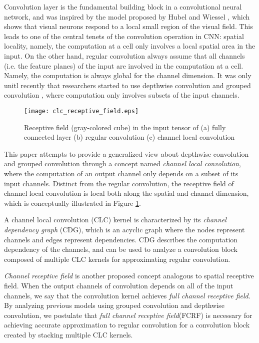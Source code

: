 \documentclass[10pt,twocolumn,letterpaper]{article}
\begin{document}
Convolution layer is the fundamental building block in a convolutional neural network, and was inspired by the model proposed by Hubel and Wiessel \cite{receptivefield1968hubel}, which shows that visual neurons respond to a local small region of the visual field. This leads to one of the central tenets of the convolution operation in CNN: spatial locality, namely, the computation at a cell only involves a local spatial area in the input.  On the other hand, regular convolution always assume that all channels (i.e. the feature planes) of the input are involved in the computation at a cell. Namely, the computation is always global for the channel dimension. It was only unitl recently that researchers started to use depthwise convolution \cite{xception2017chollet} and grouped convolution \cite{alexnet2012krizhevsky} , where computation only involves subsets of the input channels. 

\begin{figure}[t!]
\begin{center}
\texttt{[image: clc\_receptive\_field.eps]}
\end{center}
   \caption{Receptive field (gray-colored cube) in the input tensor of (a) fully connected layer (b) regular convolution (c) channel local convolution }
\label{fig:recept_fd}
\end{figure}

This paper attempts to provide a generalized view about depthwise convolution and grouped convolution through a concept named \textit{channel local convolution}, where the computation of an output channel only depends on a subset of its input channels. Distinct from the regular convolution, the receptive field of channel local convolution is local both along the spatial and channel dimension, which is conceptually illustrated in Figure \ref{fig:recept_fd}. 

A channel local convolution (CLC) kernel is characterized by its \textit{channel dependency graph} (CDG), which is an acyclic graph where the nodes represent channels and edges represent dependencies. CDG describes the computation dependency of the channels, and can be used to analyze a convolution block composed of multiple CLC kernels for approximating regular convolution. 

\textit{Channel receptive field} is another proposed concept analogous to spatial receptive field. When the output channels of convolution depends on all of the input channels, we say that the convolution kernel achieves \textit{full channel receptive field}. By analyzing previous models using grouped convolution and depthwise convolution, we postulate that \textit{full channel receptive field}(FCRF) is necessary for achieving accurate approximation to regular convolution for a  convolution block created by stacking multiple CLC kernels. 
\end{document}
